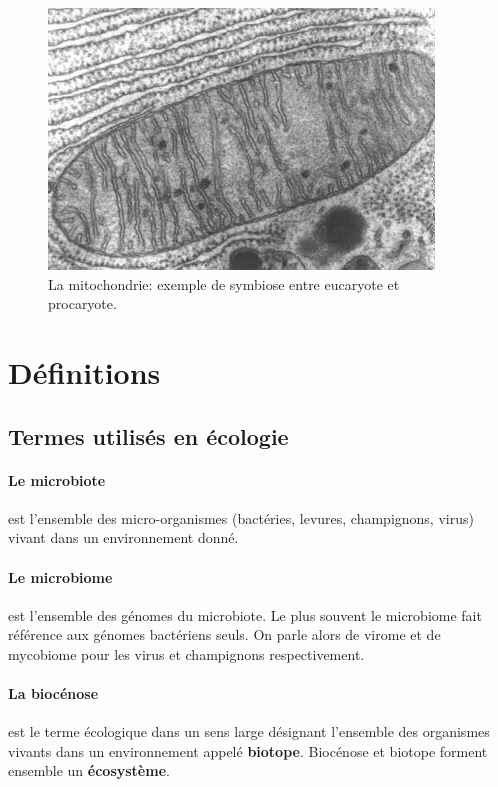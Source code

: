 \documentclass[12pt,a4paper]{article}
\begin{document}
\begin{figure}[ht]
\begin{center}
\includegraphics[scale=0.5]{img/mitochondrie.jpg}\hfill
\end{center}
\caption{La mitochondrie: exemple de symbiose entre eucaryote et procaryote.}
\label{mitochondrie}
\end{figure}



\newpage

\section{Définitions}
\subsection{Termes utilisés en écologie}

\paragraph{Le microbiote\cite{Eisen}} est l’ensemble des micro-organismes (bactéries, levures, champignons, virus) vivant dans un environnement donné.
\paragraph{Le microbiome\cite{Eisen}} est l'ensemble des génomes du microbiote. Le plus souvent le microbiome fait référence aux génomes bactériens seuls. On parle alors de virome et de mycobiome pour les virus et champignons respectivement.

\paragraph{La biocénose} est le terme écologique dans un sens large désignant l'ensemble des organismes vivants dans un environnement appelé \textbf{biotope}. Biocénose et biotope forment ensemble un \textbf{écosystème}.
\end{document}
